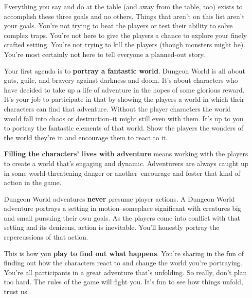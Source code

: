 Everything you say and do at the table (and away from the table, too) exists to accomplish these three goals and no others. Things that aren't on this list aren't your goals. You're not trying to beat the players or test their ability to solve complex traps. You're not here to give the players a chance to explore your finely crafted setting. You're not trying to kill the players (though monsters might be). You're most certainly not here to tell everyone a planned-out story.

Your first agenda is to \textbf{portray a fantastic world}. Dungeon World is all about guts, guile, and bravery against darkness and doom. It's about characters who have decided to take up a life of adventure in the hopes of some glorious reward. It's your job to participate in that by showing the players a world in which their characters can find that adventure. Without the player characters the world would fall into chaos or destruction--it might still even with them. It's up to you to portray the fantastic elements of that world. Show the players the wonders of the world they're in and encourage them to react to it.

\textbf{Filling the characters' lives with adventure}
means working with the players to create a world that's engaging and dynamic. Adventurers are always caught up in some world-threatening danger or another--encourage and foster that kind of action in the game.

Dungeon World adventures \textbf{never}
presume player actions. A Dungeon World adventure portrays a setting in motion--someplace significant with creatures big and small pursuing their own goals. As the players come into conflict with that setting and its denizens, action is inevitable. You'll honestly portray the repercussions of that action.

This is how you \textbf{play to find out what happens}. You're sharing in the fun of finding out how the characters react to and change the world you're portraying. You're all participants in a great adventure that's unfolding. So really, don't plan too hard. The rules of the game will fight you. It's fun to see how things unfold, trust us.



